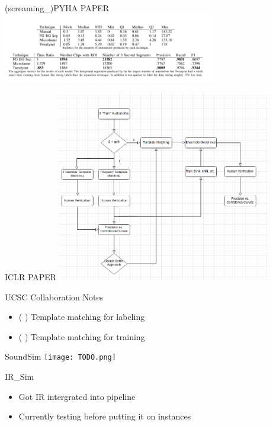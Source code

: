 \begin{frame}{(screaming_)PYHA PAPER}
    \centering
    \includegraphics[height=0.7\textheight,width=0.7\textwidth,keepaspectratio]{model_performance_01_23.png}
\end{frame}

\begin{frame}{ICLR PAPER}
    \centering
    \includegraphics[height=0.7\textheight,width=0.7\textwidth,keepaspectratio]{ICLR_WORKFLOW.png}
\end{frame}

\begin{frame}{UCSC Collaboration Notes}
    \begin{itemize}
        \item ( ) Template matching for labeling
        \item ( ) Template matching for training
    \end{itemize}    
\end{frame}

\begin{frame}{SoundSim}
    \centering
    \texttt{[image: TODO.png]}
\end{frame}

\begin{frame}{IR_Sim}
    \begin{itemize}
        \item Got IR intergrated into pipeline
        \item Currently testing before putting it on instances
    \end{itemize}    
\end{frame}






